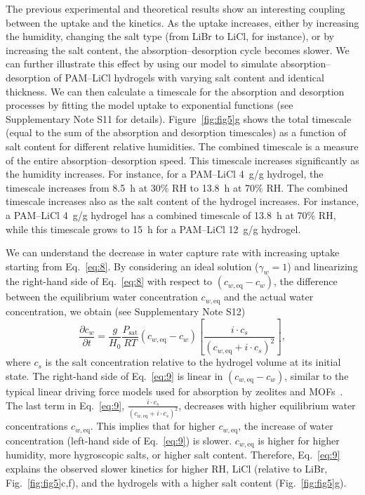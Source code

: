 \documentclass[11pt]{article}
\begin{document}
The previous experimental and theoretical results show an interesting coupling between the uptake and the kinetics. As the uptake increases, either by increasing the humidity, changing the salt type (from LiBr to LiCl, for instance), or by increasing the salt content, the absorption--desorption cycle becomes slower. We can further illustrate this effect by using our model to simulate absorption--desorption of PAM--LiCl hydrogels with varying salt content and identical thickness. We can then calculate a timescale for the absorption and desorption processes by fitting the model uptake to exponential functions (see Supplementary Note S11 for details). Figure~\ref{fig:fig5}g shows the total timescale (equal to the sum of the absorption and desorption timescales) as a function of salt content for different relative humidities. The combined timescale is a measure of the entire absorption--desorption speed. This timescale increases significantly as the humidity increases. For instance, for a PAM--LiCl 4~g/g hydrogel, the timescale increases from 8.5~h at 30\% RH to 13.8~h at 70\% RH. The combined timescale increases also as the salt content of the hydrogel increases. For instance, a PAM--LiCl 4~g/g hydrogel has a combined timescale of 13.8~h at 70\% RH, while this timescale grows to 15~h for a PAM--LiCl 12~g/g hydrogel.

We can understand the decrease in water capture rate with increasing uptake starting from Eq.~\ref{eq:8}. By considering an ideal solution ($\gamma_w = 1$) and linearizing the right-hand side of Eq.~\ref{eq:8} with respect to $(c_{w,\mathrm{eq}} - c_w)$, the difference between the equilibrium water concentration $c_{w,\mathrm{eq}}$ and the actual water concentration, we obtain (see Supplementary Note S12)
\begin{equation}
\frac{\partial c_w}{\partial t} = \frac{g}{H_0}\frac{P_{\mathrm{sat}}}{RT}\left(c_{w,\mathrm{eq}} - c_w\right)\left[\frac{i \cdot c_s}{\left(c_{w,\mathrm{eq}} + i \cdot c_s\right)^2}\right],
\label{eq:9}
\end{equation}
where $c_s$ is the salt concentration relative to the hydrogel volume at its initial state. The right-hand side of Eq.~\ref{eq:9} is linear in $(c_{w,\mathrm{eq}} - c_w)$, similar to the typical linear driving force models used for absorption by zeolites and MOFs~\cite{sircar2000,elfil2023}. The last term in Eq.~\ref{eq:9}, $\frac{i \cdot c_s}{\left(c_{w,\mathrm{eq}} + i \cdot c_s\right)^2}$, decreases with higher equilibrium water concentrations $c_{w,\mathrm{eq}}$. This implies that for higher $c_{w,\mathrm{eq}}$, the increase of water concentration (left-hand side of Eq.~\ref{eq:9}) is slower. $c_{w,\mathrm{eq}}$ is higher for higher humidity, more hygroscopic salts, or higher salt content. Therefore, Eq.~\ref{eq:9} explains the observed slower kinetics for higher RH, LiCl (relative to LiBr, Fig.~\ref{fig:fig5}c,f), and the hydrogels with a higher salt content (Fig.~\ref{fig:fig5}g).
\end{document}
